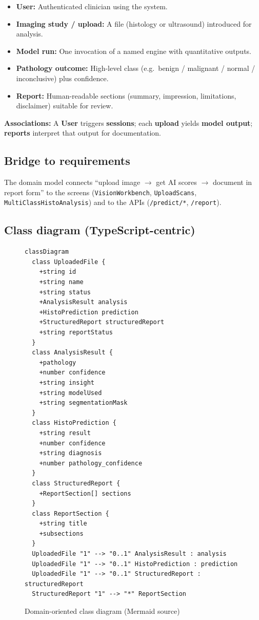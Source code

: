 \documentclass[12pt,a4paper]{report}
\begin{document}
\begin{itemize}
  \item \textbf{User:} Authenticated clinician using the system.
  \item \textbf{Imaging study / upload:} A file (histology or ultrasound) introduced for analysis.
  \item \textbf{Model run:} One invocation of a named engine with quantitative outputs.
  \item \textbf{Pathology outcome:} High-level class (e.g.\ benign / malignant / normal / inconclusive) plus confidence.
  \item \textbf{Report:} Human-readable sections (summary, impression, limitations, disclaimer) suitable for review.
\end{itemize}

\textbf{Associations:} A \textbf{User} triggers \textbf{sessions}; each \textbf{upload} yields \textbf{model output}; \textbf{reports} interpret that output for documentation.

\subsection{Bridge to requirements}

The domain model connects ``upload image $\rightarrow$ get AI scores $\rightarrow$ document in report form'' to the screens (\texttt{VisionWorkbench}, \texttt{UploadScans}, \texttt{MultiClassHistoAnalysis}) and to the APIs (\texttt{/predict/*}, \texttt{/report}).

\subsection{Class diagram (TypeScript-centric)}
\label{sec:class-domain}

\begin{figure}[htbp]
  \centering
  \begin{verbatim}
classDiagram
  class UploadedFile {
    +string id
    +string name
    +string status
    +AnalysisResult analysis
    +HistoPrediction prediction
    +StructuredReport structuredReport
    +string reportStatus
  }
  class AnalysisResult {
    +pathology
    +number confidence
    +string insight
    +string modelUsed
    +string segmentationMask
  }
  class HistoPrediction {
    +string result
    +number confidence
    +string diagnosis
    +number pathology_confidence
  }
  class StructuredReport {
    +ReportSection[] sections
  }
  class ReportSection {
    +string title
    +subsections
  }
  UploadedFile "1" --> "0..1" AnalysisResult : analysis
  UploadedFile "1" --> "0..1" HistoPrediction : prediction
  UploadedFile "1" --> "0..1" StructuredReport : structuredReport
  StructuredReport "1" --> "*" ReportSection
  \end{verbatim}
  \caption{Domain-oriented class diagram (Mermaid source)}
\end{figure}
\end{document}

